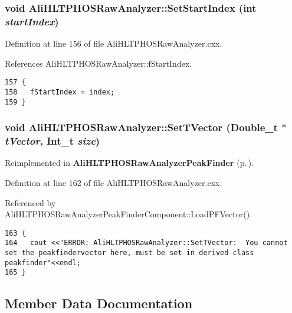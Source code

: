\subsubsection{\setlength{\rightskip}{0pt plus 5cm}void Ali\-HLTPHOSRaw\-Analyzer::Set\-Start\-Index (int {\em start\-Index})\hspace{0.3cm}{\tt  [inherited]}}\label{classAliHLTPHOSRawAnalyzer_AliHLTPHOSRawAnalyzerPeakFindera14}




Definition at line 156 of file Ali\-HLTPHOSRaw\-Analyzer.cxx.

References Ali\-HLTPHOSRaw\-Analyzer::f\-Start\-Index.

\footnotesize\begin{verbatim}157 {
158   fStartIndex = index;
159 }
\end{verbatim}\normalsize 


\subsubsection{\setlength{\rightskip}{0pt plus 5cm}void Ali\-HLTPHOSRaw\-Analyzer::Set\-TVector (Double\_\-t $\ast$ {\em t\-Vector}, Int\_\-t {\em size})\hspace{0.3cm}{\tt  [virtual, inherited]}}\label{classAliHLTPHOSRawAnalyzer_AliHLTPHOSRawAnalyzerLMSa16}




Reimplemented in {\bf Ali\-HLTPHOSRaw\-Analyzer\-Peak\-Finder} {\rm (p.\,\pageref{classAliHLTPHOSRawAnalyzerPeakFinder_AliHLTPHOSRawAnalyzerPeakFindera4})}.

Definition at line 162 of file Ali\-HLTPHOSRaw\-Analyzer.cxx.

Referenced by Ali\-HLTPHOSRaw\-Analyzer\-Peak\-Finder\-Component::Load\-PFVector().

\footnotesize\begin{verbatim}163 {
164   cout <<"ERROR: AliHLTPHOSRawAnalyzer::SetTVector:  You cannot set the peakfindervector here, must be set in derived class peakfinder"<<endl;
165 }
\end{verbatim}\normalsize 




\subsection{Member Data Documentation}
